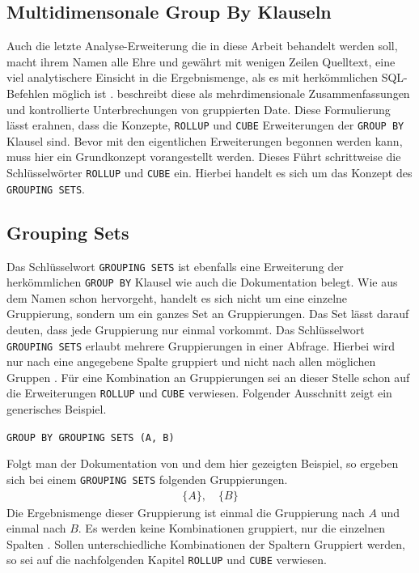 \begin{samepage}
	\section{Multidimensonale Group By Klauseln}
	\label{sec:rollup_and_cube} Auch die letzte Analyse-Erweiterung die in diese Arbeit
	behandelt werden soll, macht ihrem Namen alle Ehre und gewährt mit wenigen
	Zeilen Quelltext, eine viel analytischere Einsicht in die Ergebnismenge, als
	es mit herkömmlichen SQL-Befehlen möglich ist \citep[vgl.][S. 303]{melton2002advanced}.
	\citet[S. 303]{melton2002advanced} beschreibt diese als mehrdimensionale Zusammenfassungen
	und kontrollierte Unterbrechungen von gruppierten Date. Diese Formulierung
	lässt erahnen, dass die Konzepte, \texttt{ROLLUP} und \texttt{CUBE}
	Erweiterungen der \texttt{GROUP BY} Klausel sind. Bevor mit den eigentlichen
	Erweiterungen begonnen werden kann, muss hier ein Grundkonzept vorangestellt werden.
	Dieses Führt schrittweise die Schlüsselwörter \texttt{ROLLUP} und \texttt{CUBE}
	ein. Hierbei handelt es sich um das Konzept des \texttt{GROUPING SETS}.

	\subsection{Grouping Sets}
	\label{subsec:grouping_sets} Das Schlüsselwort \texttt{GROUPING SETS} ist ebenfalls
	eine Erweiterung der herkömmlichen \texttt{GROUP BY} Klausel wie auch die
	\citet{oracle16} Dokumentation belegt. Wie aus dem Namen schon hervorgeht, handelt
	es sich nicht um eine einzelne Gruppierung, sondern um ein ganzes Set an
	Gruppierungen. Das Set lässt darauf deuten, dass jede Gruppierung nur einmal
	vorkommt. Das Schlüsselwort \texttt{GROUPING SETS} erlaubt mehrere
	Gruppierungen in einer Abfrage. Hierbei wird nur nach eine angegebene Spalte gruppiert
	und nicht nach allen möglichen Gruppen \citep[vgl.][]{oracle16}. Für eine Kombination
	an Gruppierungen sei an dieser Stelle schon auf die Erweiterungen \texttt{ROLLUP}
	und \texttt{CUBE} verwiesen. Folgender Ausschnitt zeigt ein generisches
	Beispiel.
	\begin{center}
		\texttt{GROUP BY GROUPING SETS (A, B)}
	\end{center}
	Folgt man der Dokumentation von \citet{oracle16} und dem hier gezeigten
	Beispiel, so ergeben sich bei einem \texttt{GROUPING SETS} folgenden
	Gruppierungen.
	\begin{align*}
		\{A\}, \quad \{B\}
	\end{align*}
	Die Ergebnismenge dieser Gruppierung ist einmal die Gruppierung nach $A$ und einmal
	nach $B$. Es werden keine Kombinationen gruppiert, nur die einzelnen Spalten \citep[vgl.][]{oracle16}.
	Sollen unterschiedliche Kombinationen der Spaltern Gruppiert werden, so sei
	auf die nachfolgenden Kapitel \texttt{ROLLUP} und \texttt{CUBE} verwiesen.
\end{samepage}


